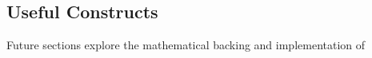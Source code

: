 \subsection{Useful Constructs}

Future sections explore the mathematical backing and implementation of 